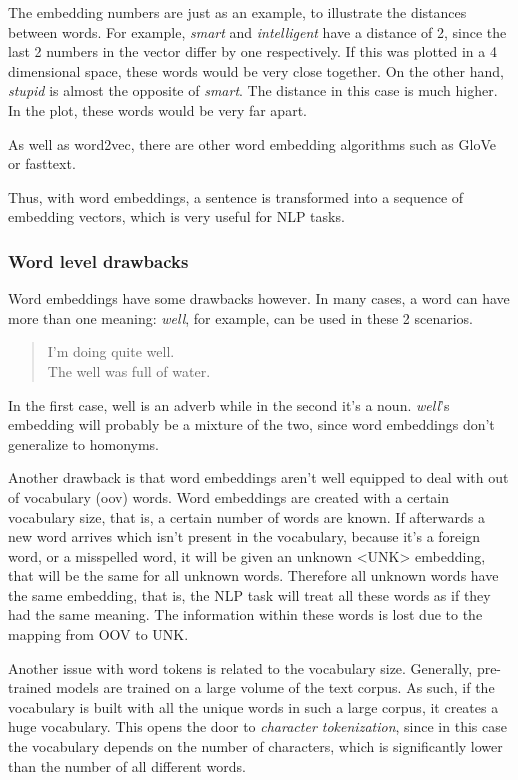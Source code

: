 The embedding numbers are just as an example, to illustrate the distances between words. For example, \emph{smart} and \emph{intelligent} have a distance of 2, since the last 2 numbers in the vector differ by one respectively. If this was plotted in a 4 dimensional space, these words would be very close together. On the other hand, \emph{stupid} is almost the opposite of \emph{smart}. The distance in this case is much higher. In the plot, these words would be very far apart.

As well as word2vec, there are other word embedding algorithms such as GloVe or fasttext.

Thus, with word embeddings, a sentence is transformed into a sequence of embedding vectors, which is very useful for NLP tasks.

\subsubsection{Word level drawbacks}

Word embeddings have some drawbacks however. In many cases, a word can have more than one meaning: \emph{well}, for example, can be used in these 2 scenarios.

\begin{quote}
    I'm doing quite well.\\
    The well was full of water.
\end{quote}

In the first case, well is an adverb while in the second it's a noun. \emph{well}'s embedding will probably be a mixture of the two, since word embeddings don't generalize to homonyms.

Another drawback is that word embeddings aren't well equipped to deal with out of vocabulary (oov) words. Word embeddings are created with a certain vocabulary size, that is, a certain number of words are known. If afterwards a new word arrives which isn't present in the vocabulary, because it's a foreign word, or a misspelled word, it will be given an unknown <UNK> embedding, that will be the same for all unknown words. Therefore all unknown words have the same embedding, that is, the NLP task will treat all these words as if they had the same meaning. The information within these words is lost due to the mapping from OOV to UNK.

Another issue with word tokens is related to the vocabulary size. Generally, pre-trained models are trained on a large volume of the text corpus. As such, if the vocabulary is built with all the unique words in such a large corpus, it creates a huge vocabulary. This opens the door to \emph{character tokenization}, since in this case the vocabulary depends on the number of characters, which is significantly lower than the number of all different words.

